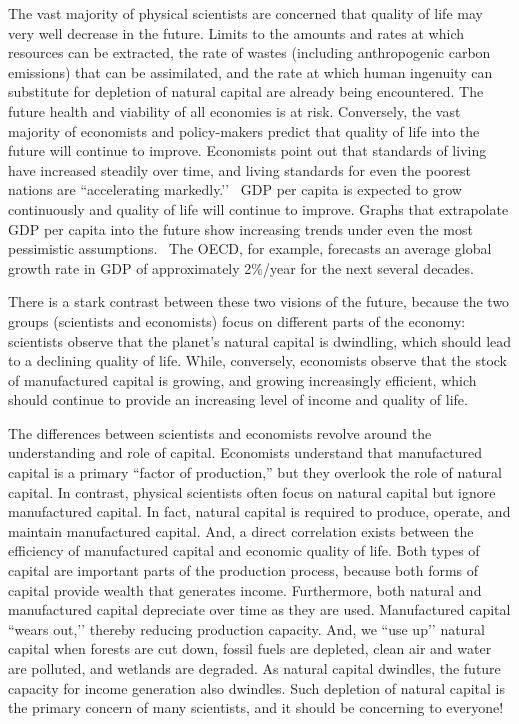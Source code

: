 
The vast majority of physical scientists are concerned that quality of life may very well decrease in the future. Limits to the amounts and rates at which resources can be extracted, the rate of wastes (including anthropogenic carbon emissions) that can be assimilated, and
 the rate at which human ingenuity can substitute for depletion of natural capital are already being encountered. The future health and
 viability of all economies is at risk.\cite{IPCC2013} Conversely, the vast majority of economists and policy-makers predict that
 quality of life into the future will continue to improve. Economists point out that standards of living have increased steadily over time,
 and living standards for even the poorest nations are ``accelerating markedly.’’~\cite{Malik:2013aa} GDP per capita is expected to
 grow continuously and quality of life will continue to improve. Graphs that extrapolate GDP per capita into the future show increasing
 trends under even the most pessimistic assumptions.~\cite[p. 170]{Malik:2013aa} The OECD, for example, forecasts an average global
 growth rate in GDP of approximately 2\%/year for the next several decades.\cite[Table A.1]{OECD2012}


There is a stark contrast between these two visions of the future, because the two groups (scientists and economists) focus on 
different parts of the economy: scientists observe that the planet's natural capital is dwindling, 
which should lead to a declining quality of life.
 While, conversely, economists observe that the stock of manufactured capital is growing, and growing increasingly efficient, which
 should continue to provide an increasing level of income and quality of life. 


The differences between scientists and economists revolve around the understanding and role of capital.
Economists understand that manufactured capital is a primary ``factor of production,'' but they overlook the role of natural capital. 
In contrast, physical scientists often focus on natural capital but ignore manufactured capital. In fact, natural capital is required to
 produce, operate, and maintain manufactured capital. And, a direct correlation exists between the efficiency of manufactured capital
 and economic quality of life. Both types of capital are important parts of the production process, because both forms of capital provide
 wealth that generates income. Furthermore, both natural and manufactured capital depreciate over time as they are used.
 Manufactured capital ``wears out,’’ thereby reducing production capacity. And, we ``use up’’ natural capital when forests are cut
 down, fossil fuels are depleted, clean air and water are polluted, and wetlands are degraded. As natural capital dwindles, the future
 capacity for income generation also dwindles. Such depletion of natural capital is the primary concern of many scientists, and it should
 be concerning to everyone!


